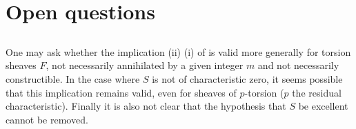 \section{Open questions} \label{XIV.6}

\subsection{} \label{XIV.6.1} One may ask whether the implication \textup{(ii)} \ALORS \textup{(i)} of  is valid more generally for torsion sheaves $F$, not necessarily annihilated by a given integer $m$ and not necessarily constructible. In the case where $S$ is not of characteristic zero, it seems possible that this implication remains valid, even for sheaves of $p$-torsion ($p$ the residual characteristic). Finally it is also not clear that the hypothesis that $S$ be excellent cannot be removed.

